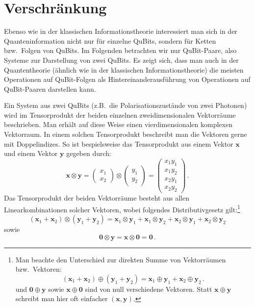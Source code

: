 \section{Verschr\"ankung}

Ebenso wie in der klassischen Informationstheorie interessiert man sich in der Quanteninformation
nicht nur f\"ur einzelne QuBits, sondern f\"ur Ketten bzw.\ Folgen von QuBits. Im Folgenden betrachten wir
nur QuBit-Paare, also Systeme zur Darstellung von zwei QuBits. Es zeigt sich, dass man auch in der
Quantentheorie (\"ahnlich wie in der klassischen Informationstheorie) die meisten Operationen auf
QuBit-Folgen als Hintereinanderausf\"uhrung von Operationen auf QuBit-Paaren darstellen kann. 

Ein System aus zwei QuBits (z.B.\ die Polarisationszust\"ande von zwei Photonen) wird im Tensorprodukt
der beiden einzelnen zweidimensionalen Vektorr\"aume beschrieben. Man erh\"alt auf diese Weise einen
vierdimensionalen komplexen Vektorraum. In einem solchen Tensorprodukt
beschreibt man die Vektoren gerne mit Doppelindizes. So ist bespielsweise das Tensorprodukt aus
einem Vektor $\pmb{x}$ und einem Vektor $\pmb{y}$ gegeben durch:
\begin{equation}
\label{eq_QM1_Tensor}
       \pmb{x} \otimes \pmb{y} = \left( \begin{array}{c} x_1 \\ x_2 \end{array} \right) \otimes
          \left( \begin{array}{c} y_1 \\ y_2 \end{array} \right) =
           \left( \begin{array}{c} x_1 y_1  \\ x_1 y_2 \\ x_2 y_1 \\ x_2 y_2  \end{array} \right)
            \, .
\end{equation}
Das Tensorprodukt der beiden Vektorr\"aume besteht aus allen Linearkombinationen solcher
Vektoren, wobei folgendes Distributivgesetz gilt:\footnote{Man beachte den Unterschied zur
direkten Summe von Vektorr\"aumen bzw.\ Vektoren:
\[      (\pmb{x}_1 + \pmb{x}_2) \oplus (\pmb{y}_1 + \pmb{y}_2) = \pmb{x}_1  \oplus \pmb{y}_1 +
     \pmb{x}_2  \oplus \pmb{y}_2  \, . \]  
und $\pmb{0} \oplus \pmb{y}$ sowie $\pmb{x}\oplus \pmb{0}$ sind von null verschiedene Vektoren. Statt
$\pmb{x} \oplus \pmb{y}$ schreibt man hier oft einfacher $(\pmb{x},\pmb{y})$.}
\begin{equation}
     (\pmb{x}_1 + \pmb{x}_2) \otimes (\pmb{y}_1 + \pmb{y}_2) = \pmb{x}_1  \otimes \pmb{y}_1 +
     \pmb{x}_1  \otimes \pmb{y}_2 +\pmb{x}_2  \otimes \pmb{y}_1 +\pmb{x}_2  \otimes \pmb{y}_2 
\end{equation}
sowie
\begin{equation}
     \pmb{0} \otimes \pmb{y} = \pmb{x} \otimes \pmb{0} = \pmb{0} \, .
\end{equation}

